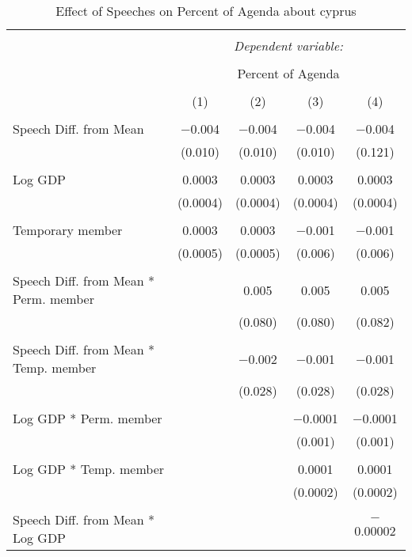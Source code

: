 
\begin{table}[!htbp] \centering 
  \caption{Effect of Speeches on Percent of Agenda about cyprus} 
  \label{} 
\begin{tabular}{@{\extracolsep{5pt}}lcccc} 
\\[-1.8ex]\hline 
\hline \\[-1.8ex] 
 & \multicolumn{4}{c}{\textit{Dependent variable:}} \\ 
\cline{2-5} 
\\[-1.8ex] & \multicolumn{4}{c}{Percent of Agenda} \\ 
\\[-1.8ex] & (1) & (2) & (3) & (4)\\ 
\hline \\[-1.8ex] 
 Speech Diff. from Mean & $-$0.004 & $-$0.004 & $-$0.004 & $-$0.004 \\ 
  & (0.010) & (0.010) & (0.010) & (0.121) \\ 
  & & & & \\ 
 Log GDP & 0.0003 & 0.0003 & 0.0003 & 0.0003 \\ 
  & (0.0004) & (0.0004) & (0.0004) & (0.0004) \\ 
  & & & & \\ 
 Temporary member & 0.0003 & 0.0003 & $-$0.001 & $-$0.001 \\ 
  & (0.0005) & (0.0005) & (0.006) & (0.006) \\ 
  & & & & \\ 
 Speech Diff. from Mean * Perm. member &  & 0.005 & 0.005 & 0.005 \\ 
  &  & (0.080) & (0.080) & (0.082) \\ 
  & & & & \\ 
 Speech Diff. from Mean * Temp. member &  & $-$0.002 & $-$0.001 & $-$0.001 \\ 
  &  & (0.028) & (0.028) & (0.028) \\ 
  & & & & \\ 
 Log GDP * Perm. member &  &  & $-$0.0001 & $-$0.0001 \\ 
  &  &  & (0.001) & (0.001) \\ 
  & & & & \\ 
 Log GDP * Temp. member &  &  & 0.0001 & 0.0001 \\ 
  &  &  & (0.0002) & (0.0002) \\ 
  & & & & \\ 
 Speech Diff. from Mean * Log GDP &  &  &  & $-$0.00002 \\ 

\end{tabular}
\end{table}
